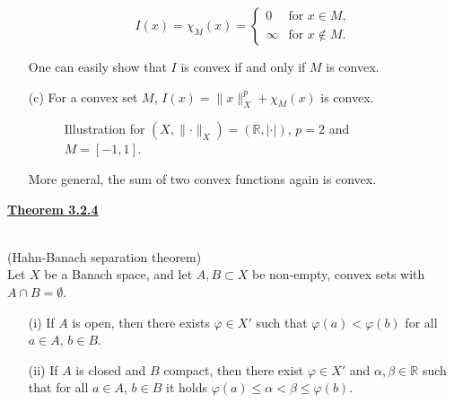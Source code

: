 \begin{itemize}
	\[I(x)=\chi_M(x)=\left\{\begin{array}{rl}
		0&\text{for }x\in M,\\
		\infty&\text{for }x\notin M.
	\end{array}\right.\]

	One can easily show that $I$ is convex if and only if $M$ is convex.
	\item[(c)] For a convex set $M$, $I(x)=\lVert x\rVert_X^p+\chi_M(x)$ is convex.

	\begin{figure}[ht]
		\centering
		\caption{Illustration for $(X,\lVert\cdot\rVert_X)=(\mathbb{R},\lvert\cdot\rvert)$, $p=2$ and $M=[-1,1]$.}
	\end{figure}

	More general, the sum of two convex functions again is convex.\\[11pt]
\end{itemize}

\hypertarget{theorem_3_2_4}{\textbf{\underline{Theorem 3.2.4}}}\\
(Hahn-Banach separation theorem)\\
Let $X$ be a Banach space, and let $A,B\subset X$ be non-empty, convex sets with $A\cap B=\emptyset$.
\begin{itemize}
	\item[(i)] If $A$ is open, then there exists $\varphi\in X'$ such that $\varphi(a)<\varphi(b)$ for all $a\in A$, $b\in B$.
	\item[(ii)] If $A$ is closed and $B$ compact, then there exist $\varphi\in X'$ and $\alpha,\beta\in\mathbb{R}$ such that for all $a\in A$, $b\in B$ it holds $\varphi(a)\leq\alpha<\beta\leq\varphi(b)$.\\
\end{itemize}

